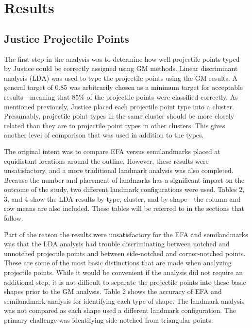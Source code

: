 \documentclass[PCJ,Unicode,screen,mode=plain]{cedram}
\begin{document}
\section{Results}

\subsection{Justice Projectile Points}

The first step in the analysis was to determine how well projectile points typed by Justice could be correctly assigned using GM methods. Linear discriminant analysis (LDA) was used to type the projectile points using the GM results. A general target of 0.85 was arbitrarily chosen as a minimum target for acceptable results---meaning that 85\% of the projectile points were classified correctly. As mentioned previously, Justice placed each projectile point type into a cluster. Presumably, projectile point types in the same cluster should be more closely related than they are to projectile point types in other clusters. This gives another level of comparison that was used in addition to the types.

The original intent was to compare EFA versus semilandmarks placed at equidistant locations around the outline. However, these results were unsatisfactory, and a more traditional landmark analysis was also completed. Because the number and placement of landmarks has a significant impact on the outcome of the study, two different landmark configurations were used. Tables 2, 3, and 4 show the LDA results by type, cluster, and by shape---the column and row means are also included. These tables will be referred to in the sections that follow.

Part of the reason the results were unsatisfactory for the EFA and semilandmarks was that the LDA analysis had trouble discriminating between notched and unnotched projectile points and between side-notched and corner-notched points. These are some of the most basic distinctions that are made when analyzing projectile points. While it would be convenient if the analysis did not require an additional step, it is not difficult to separate the projectile points into these basic shapes prior to the GM analysis. Table 2 shows the accuracy of EFA and semilandmark analysis for identifying each type of shape. The landmark analysis was not compared as each shape used a different landmark configuration. The primary challenge was identifying side-notched from triangular points.
\end{document}

